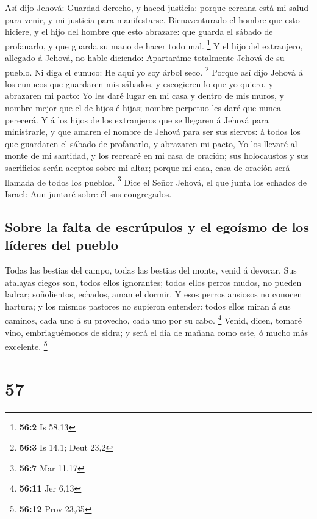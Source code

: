  Así dijo Jehová: Guardad derecho, y haced justicia:
porque cercana está mi salud para venir, y mi justicia para
manifestarse.  Bienaventurado el hombre que esto hiciere,
y el hijo del hombre que esto abrazare: que guarda el sábado de
profanarlo, y que guarda su mano de hacer todo mal. \footnote{\textbf{56:2}
  Is 58,13}  Y el hijo del extranjero, allegado á Jehová,
no hable diciendo: Apartaráme totalmente Jehová de su pueblo. Ni diga el
eunuco: He aquí yo soy árbol seco. \footnote{\textbf{56:3} Is 14,1; Deut
  23,2}  Porque así dijo Jehová á los eunucos que
guardaren mis sábados, y escogieren lo que yo quiero, y abrazaren mi
pacto:  Yo les daré lugar en mi casa y dentro de mis
muros, y nombre mejor que el de hijos é hijas; nombre perpetuo les daré
que nunca perecerá.  Y á los hijos de los extranjeros que
se llegaren á Jehová para ministrarle, y que amaren el nombre de Jehová
para ser sus siervos: á todos los que guardaren el sábado de profanarlo,
y abrazaren mi pacto,  Yo los llevaré al monte de mi
santidad, y los recrearé en mi casa de oración; sus holocaustos y sus
sacrificios serán aceptos sobre mi altar; porque mi casa, casa de
oración será llamada de todos los pueblos. \footnote{\textbf{56:7} Mar
  11,17}  Dice el Señor Jehová, el que junta los echados
de Israel: Aun juntaré sobre él sus congregados.

\hypertarget{sobre-la-falta-de-escruxfapulos-y-el-egouxedsmo-de-los-luxedderes-del-pueblo}{%
\subsection{Sobre la falta de escrúpulos y el egoísmo de los líderes del
pueblo}\label{sobre-la-falta-de-escruxfapulos-y-el-egouxedsmo-de-los-luxedderes-del-pueblo}}

 Todas las bestias del campo, todas las bestias del monte,
venid á devorar.  Sus atalayas ciegos son, todos ellos
ignorantes; todos ellos perros mudos, no pueden ladrar; soñolientos,
echados, aman el dormir.  Y esos perros ansiosos no
conocen hartura; y los mismos pastores no supieron entender: todos ellos
miran á sus caminos, cada uno á su provecho, cada uno por su cabo.
\footnote{\textbf{56:11} Jer 6,13}  Venid, dicen, tomaré
vino, embriaguémonos de sidra; y será el día de mañana como este, ó
mucho más excelente. \footnote{\textbf{56:12} Prov 23,35}

\hypertarget{section-56}{%
\section{57}\label{section-56}}


